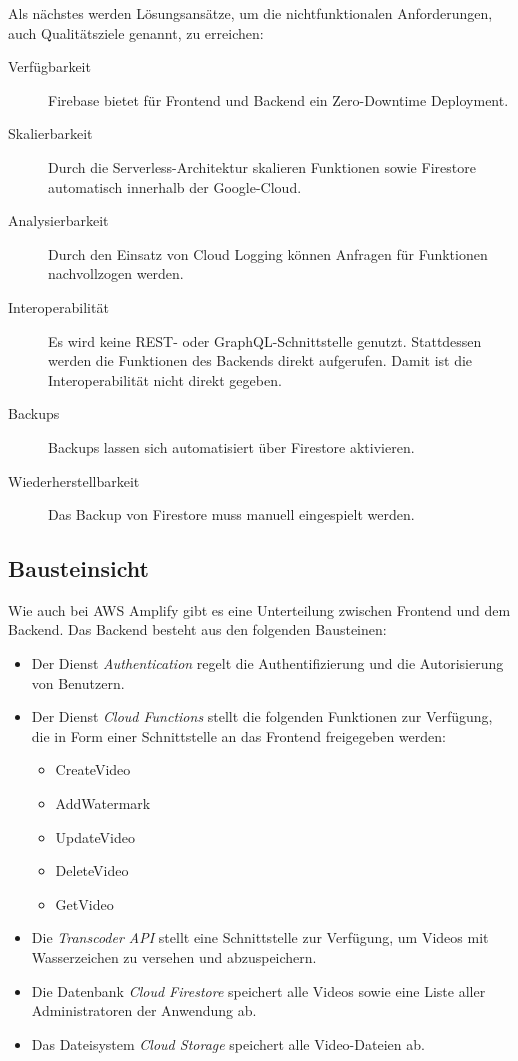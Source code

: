 Als nächstes werden Lösungsansätze, um die nichtfunktionalen Anforderungen, auch Qualitätsziele genannt, zu erreichen:

\begin{description}
   \item[Verfügbarkeit] Firebase bietet für Frontend und Backend ein Zero-Downtime Deployment.
   \item[Skalierbarkeit] Durch die Serverless-Architektur skalieren Funktionen sowie Firestore automatisch innerhalb der Google-Cloud.
   \item[Analysierbarkeit] Durch den Einsatz von Cloud Logging können Anfragen für Funktionen nachvollzogen werden.
   \item[Interoperabilität] Es wird keine REST- oder GraphQL-Schnittstelle genutzt. Stattdessen werden die Funktionen des Backends direkt aufgerufen. Damit ist die Interoperabilität nicht direkt gegeben.
   \item[Backups] Backups lassen sich automatisiert über Firestore aktivieren.
   \item[Wiederherstellbarkeit] Das Backup von Firestore muss manuell eingespielt werden.
\end{description}

\subsection{Bausteinsicht}

Wie auch bei \ac{AWS} Amplify gibt es eine Unterteilung zwischen Frontend und dem Backend. Das Backend besteht aus den folgenden Bausteinen:

\begin{itemize}
  \item{Der Dienst \textit{Authentication} regelt die Authentifizierung und die Autorisierung von Benutzern.}
  \item{Der Dienst \textit{Cloud Functions} stellt die folgenden Funktionen zur Verfügung, die in Form einer Schnittstelle an das Frontend freigegeben werden:}
  \begin{itemize}
    \item CreateVideo
    \item AddWatermark
    \item UpdateVideo
    \item DeleteVideo
    \item GetVideo
  \end{itemize}
  \item{Die \textit{Transcoder \ac{API}} stellt eine Schnittstelle zur Verfügung, um Videos mit Wasserzeichen zu versehen und abzuspeichern.}
  \item{Die Datenbank \textit{Cloud Firestore} speichert alle Videos sowie eine Liste aller Administratoren der Anwendung ab.}
  \item{Das Dateisystem \textit{Cloud Storage} speichert alle Video-Dateien ab.}
\end{itemize}

